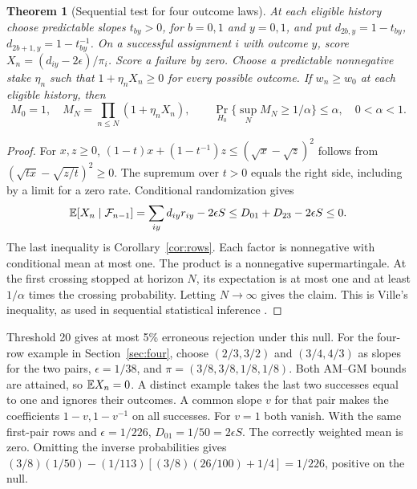 \documentclass[11pt,letterpaper]{article}
\newtheorem{theorem}{Theorem}[section]\newtheorem{proposition}[theorem]{Proposition}\newtheorem{corollary}[theorem]{Corollary}
\begin{document}
\begin{theorem}[Sequential test for four outcome laws]\label{thm:e}
At each eligible history choose predictable slopes $t_{by}>0$, for $b=0,1$ and $y=0,1$, and put $d_{2b,y}=1-t_{by}$, $d_{2b+1,y}=1-t_{by}^{-1}$. On a successful assignment $i$ with outcome $y$, score $X_n=(d_{iy}-2\epsilon)/\pi_i$. Score a failure by zero. Choose a predictable nonnegative stake $\eta_n$ such that $1+\eta_nX_n\ge0$ for every possible outcome. If $w_n\ge w_0$ at each eligible history, then
\[
 M_0=1,\quad M_N=\prod_{n\le N}(1+\eta_nX_n),\qquad
 \Pr_{H_0}\{\sup_N M_N\ge1/\alpha\}\le\alpha,\quad 0<\alpha<1 .
\]
\end{theorem}
\begin{proof}
For $x,z\ge0$, $(1-t)x+(1-t^{-1})z\le(\sqrt{x}-\sqrt{z})^2$ follows from $(\sqrt{tx}-\sqrt{z/t})^2\ge0$. The supremum over $t>0$ equals the right side, including by a limit for a zero rate. Conditional randomization gives
\[
 \mathbb E[X_n\mid\mathcal F_{n-1}]=\sum_{iy}d_{iy}r_{iy}-2\epsilon S
 \le D_{01}+D_{23}-2\epsilon S\le0 .
\]
The last inequality is Corollary~\ref{cor:rows}. Each factor is nonnegative with conditional mean at most one. The product is a nonnegative supermartingale. At the first crossing stopped at horizon $N$, its expectation is at most one and at least $1/\alpha$ times the crossing probability. Letting $N\to\infty$ gives the claim. This is Ville's inequality, as used in sequential statistical inference \cite{wills}.
\end{proof}

Threshold 20 gives at most 5\% erroneous rejection under this null. For the four-row example in Section~\ref{sec:four}, choose $(2/3,3/2)$ and $(3/4,4/3)$ as slopes for the two pairs, $\epsilon=1/38$, and $\pi=(3/8,3/8,1/8,1/8)$. Both AM–GM bounds are attained, so $\mathbb E X_n=0$. A distinct example takes the last two successes equal to one and ignores their outcomes. A common slope $v$ for that pair makes the coefficients $1-v,1-v^{-1}$ on all successes. For $v=1$ both vanish. With the same first-pair rows and $\epsilon=1/226$, $D_{01}=1/50=2\epsilon S$. The correctly weighted mean is zero. Omitting the inverse probabilities gives $(3/8)(1/50)-(1/113)[(3/8)(26/100)+1/4]=1/226$, positive on the null.
\end{document}

